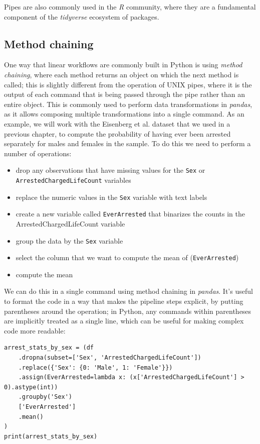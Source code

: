 Pipes are also commonly used in the \textit{R} community, where they are a fundamental component of the \textit{tidyverse} ecosystem of packages.

\subsection{Method chaining}

One way that linear workflows are commonly built in Python is using \textit{method chaining}, where each method returns an object on which the next method is called; this is slightly different from the operation of UNIX pipes, where it is the output of each command that is being passed through the pipe rather than an entire object.  This is commonly used to perform data transformations in \textit{pandas}, as it allows composing multiple transformations into a single command.  As an example, we will work with the Eisenberg et al. dataset that we used in a previous chapter, to compute the probability of having ever been arrested separately for males and females in the sample. To do this we need to perform a number of operations:

\begin{itemize}
\item drop any observations that have missing values for the \texttt{Sex} or \texttt{ArrestedChargedLifeCount} variables
\item replace the numeric values in the \texttt{Sex} variable with text labels
\item create a new variable called \texttt{EverArrested} that binarizes the counts in the ArrestedChargedLifeCount variable
\item group the data by the \texttt{Sex} variable
\item select the column that we want to compute the mean of (\texttt{EverArrested})
\item compute the mean
\end{itemize}

We can do this in a single command using method chaining in \textit{pandas}.  It's useful to format the code in a way that makes the pipeline steps explicit, by putting parentheses around the operation; in Python, any commands within parentheses are implicitly treated as a single line, which can be useful for making complex code more readable:

\begin{lstlisting}[style=Python]
arrest_stats_by_sex = (df
    .dropna(subset=['Sex', 'ArrestedChargedLifeCount'])
    .replace({'Sex': {0: 'Male', 1: 'Female'}})
    .assign(EverArrested=lambda x: (x['ArrestedChargedLifeCount'] > 0).astype(int))
    .groupby('Sex')
    ['EverArrested']
    .mean()
)
print(arrest_stats_by_sex)
\end{lstlisting}

